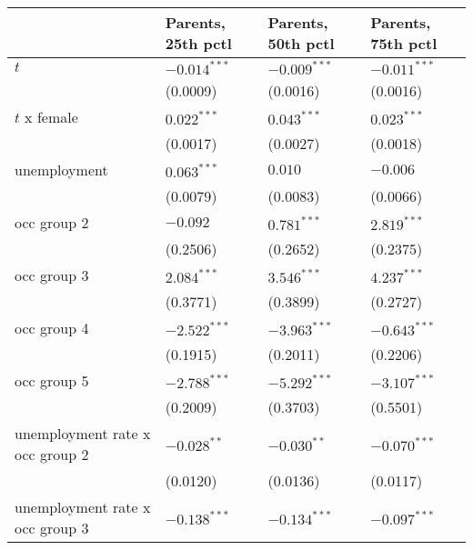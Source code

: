 \begin{tabular}{llll}
\toprule
{} & Parents, 25th pctl & Parents, 50th pctl & Parents, 75th pctl \\
\midrule
$t$                                      &     $-0.014^{***}$ &     $-0.009^{***}$ &     $-0.011^{***}$ \\
                                         &           (0.0009) &           (0.0016) &           (0.0016) \\
$t$ x female                             &      $0.022^{***}$ &      $0.043^{***}$ &      $0.023^{***}$ \\
                                         &           (0.0017) &           (0.0027) &           (0.0018) \\
unemployment                             &      $0.063^{***}$ &            $0.010$ &           $-0.006$ \\
                                         &           (0.0079) &           (0.0083) &           (0.0066) \\
occ group 2                              &           $-0.092$ &      $0.781^{***}$ &      $2.819^{***}$ \\
                                         &           (0.2506) &           (0.2652) &           (0.2375) \\
occ group 3                              &      $2.084^{***}$ &      $3.546^{***}$ &      $4.237^{***}$ \\
                                         &           (0.3771) &           (0.3899) &           (0.2727) \\
occ group 4                              &     $-2.522^{***}$ &     $-3.963^{***}$ &     $-0.643^{***}$ \\
                                         &           (0.1915) &           (0.2011) &           (0.2206) \\
occ group 5                              &     $-2.788^{***}$ &     $-5.292^{***}$ &     $-3.107^{***}$ \\
                                         &           (0.2009) &           (0.3703) &           (0.5501) \\
unemployment rate x occ group 2          &      $-0.028^{**}$ &      $-0.030^{**}$ &     $-0.070^{***}$ \\
                                         &           (0.0120) &           (0.0136) &           (0.0117) \\
unemployment rate x occ group 3          &     $-0.138^{***}$ &     $-0.134^{***}$ &     $-0.097^{***}$ \\

\end{tabular}
